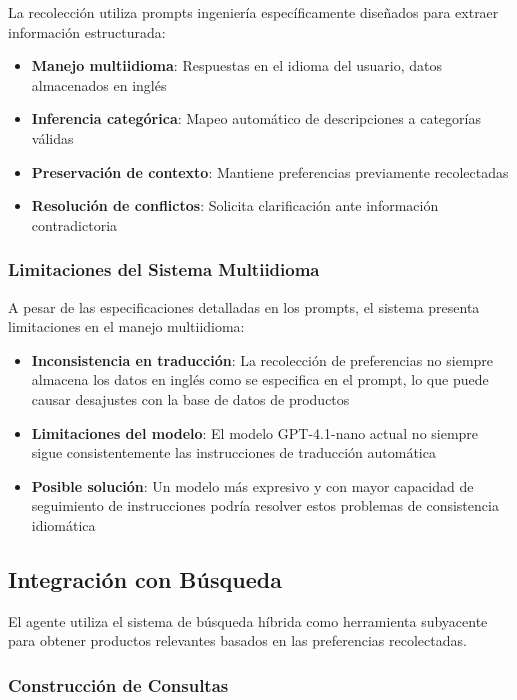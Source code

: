 La recolección utiliza prompts ingeniería específicamente diseñados para extraer información estructurada:

\begin{itemize}
    \item \textbf{Manejo multiidioma}: Respuestas en el idioma del usuario, datos almacenados en inglés
    \item \textbf{Inferencia categórica}: Mapeo automático de descripciones a categorías válidas
    \item \textbf{Preservación de contexto}: Mantiene preferencias previamente recolectadas
    \item \textbf{Resolución de conflictos}: Solicita clarificación ante información contradictoria
\end{itemize}

\subsubsection{Limitaciones del Sistema Multiidioma}

A pesar de las especificaciones detalladas en los prompts, el sistema presenta limitaciones en el manejo multiidioma:

\begin{itemize}
    \item \textbf{Inconsistencia en traducción}: La recolección de preferencias no siempre almacena los datos en inglés como se especifica en el prompt, lo que puede causar desajustes con la base de datos de productos
    \item \textbf{Limitaciones del modelo}: El modelo GPT-4.1-nano actual no siempre sigue consistentemente las instrucciones de traducción automática
    \item \textbf{Posible solución}: Un modelo más expresivo y con mayor capacidad de seguimiento de instrucciones podría resolver estos problemas de consistencia idiomática
\end{itemize}

\subsection{Integración con Búsqueda}

El agente utiliza el sistema de búsqueda híbrida como herramienta subyacente para obtener productos relevantes basados en las preferencias recolectadas.

\subsubsection{Construcción de Consultas}

